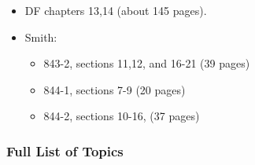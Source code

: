 \begin{itemize}
\item
  DF chapters 13,14 (about 145 pages).
\item
  Smith:

  \begin{itemize}
  \tightlist
  \item
    843-2, sections 11,12, and 16-21 (39 pages)
  \item
    844-1, sections 7-9 (20 pages)
  \item
    844-2, sections 10-16, (37 pages)
  \end{itemize}
\end{itemize}

\hypertarget{full-list-of-topics-1}{%
\subsubsection{Full List of Topics}\label{full-list-of-topics-1}}

